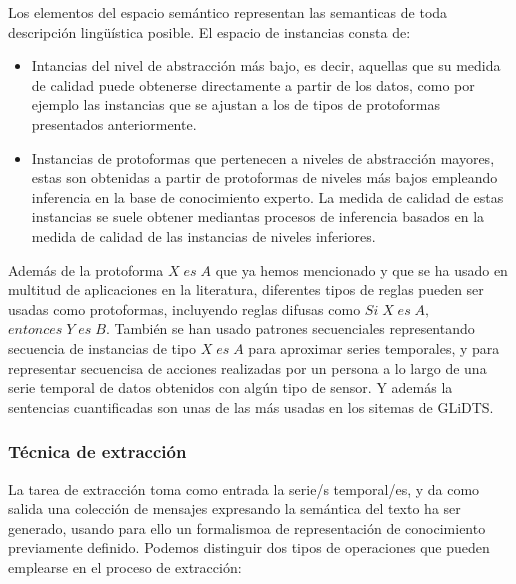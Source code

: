 \documentclass[10pt,a4paper]{article}
\begin{document}
Los elementos del espacio semántico representan las semanticas de toda descripción lingüística posible. El espacio de instancias consta de:

\begin{itemize}
\item Intancias del nivel de abstracción más bajo, es decir, aquellas que su medida de calidad puede obtenerse directamente a partir de los datos, como por ejemplo las instancias que se ajustan a los de tipos de protoformas presentados anteriormente.
\item Instancias de protoformas que pertenecen a niveles de abstracción mayores, estas son obtenidas a partir de protoformas de niveles más bajos empleando inferencia en la base de conocimiento experto. La medida de calidad de estas instancias se suele obtener mediantas procesos de inferencia basados en la medida de calidad de las instancias de niveles inferiores.
\end{itemize}

Además de la protoforma $X \; es \; A$ que ya hemos mencionado y que se ha usado en multitud de aplicaciones en la literatura, diferentes tipos de reglas pueden ser usadas como protoformas, incluyendo reglas difusas como $Si \; X \; es \; A,$ $entonces \; Y \; es \; B$. También se han usado patrones secuenciales representando secuencia de instancias de tipo $X \; es \; A$ para aproximar series temporales, y para representar secuencisa de acciones realizadas por un persona a lo largo de una serie temporal de datos obtenidos con algún tipo de sensor. Y además la sentencias cuantificadas son unas de las más usadas en los sitemas de GLiDTS.

\subsubsection{Técnica de extracción}

La tarea de extracción toma como entrada la serie/s temporal/es, y da como salida una colección de mensajes expresando la semántica del texto ha ser generado, usando para ello un formalismoa de representación de conocimiento previamente definido. Podemos distinguir dos tipos de operaciones que pueden emplearse en el proceso de extracción:
\end{document}
